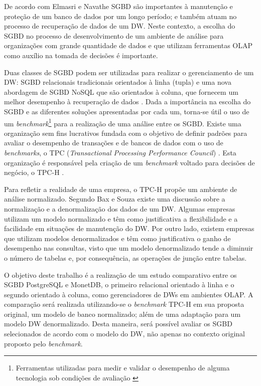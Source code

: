 De acordo com Elmasri e Navathe \cite{navathe2011banco} SGBD são importantes à manutenção 
e proteção de um banco de dados por um longo período; e também atuam no processo de recuperação de dados de um DW. Neste contexto, 
a escolha do SGBD no processo de desenvolvimento de um ambiente de análise para organizações com grande quantidade de dados e que utilizam ferramentas OLAP 
como auxílio na tomada de decisões é importante. 

Duas classes de SGBD podem ser utilizadas para realizar o gerenciamento de um DW: SGBD relacionais tradicionais orientados à linha (tupla) e uma nova abordagem de SGBD 
NoSQL que são orientados à coluna, que fornecem um melhor desempenho à recuperação de dados \cite{good2017column}. 
Dada a importância na escolha do SGBD e as diferentes soluções apresentadas por cada um, torna-se útil o uso de um 
\textit{benchmark}\footnote{Ferramentas utilizadas para medir e validar o desempenho de alguma tecnologia sob condições de avaliação \cite{bouckaert2010benchmarking}} 
para a realização de uma análise entre os SGBD. Existe uma organização sem fins lucrativos fundada com o objetivo de definir padrões para avaliar o 
desempenho de transações e de bancos de dados com o uso de \textit{benchmarks}, o TPC (\textit{Transactional Processing Performance Council}) \cite{tpc2017page}. 
Esta organização é responsável pela criação de um \textit{benchmark} voltado para decisões de negócio, o TPC-H \cite{tpch2017page}.

Para refletir a realidade de uma empresa, o TPC-H propõe um ambiente de análise normalizado. Segundo Bax e Souza \cite{bax2003modelagem} 
existe uma discussão sobre a normalização e a denormalização dos dados de um DW. Algumas empresas utilizam um modelo normalizado e têm como 
justificativa a flexibilidade e a facilidade em situações de manutenção do DW. Por outro lado, existem empresas que utilizam modelos denormalizados 
e têm como justificativa o ganho de desempenho nas consultas, visto que um modelo denormalizado tende a diminuir o número de tabelas e, por consequência, 
as operações de junção entre tabelas. 

O objetivo deste trabalho é a realização de um estudo comparativo entre os SGBD PostgreSQL e MonetDB, o primeiro relacional orientado à linha e o segundo orientado à coluna, 
como gerenciadores de DWs em ambientes OLAP. A comparação será realizada utilizando-se o \textit{benchmark} TPC-H em sua proposta original, um modelo de banco normalizado; 
além de uma adaptação para um modelo DW denormalizado. Desta maneira, será possível avaliar os SGBD selecionados de acordo com o modelo do DW, não apenas no 
contexto original proposto pelo \textit{benchmark}. 

